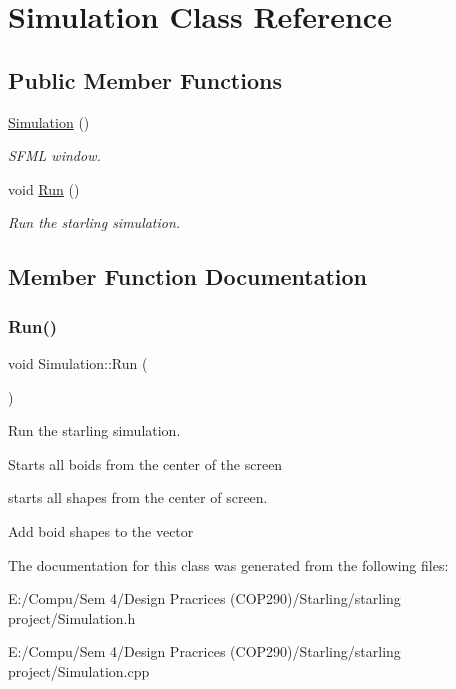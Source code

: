 \hypertarget{class_simulation}{}\section{Simulation Class Reference}
\label{class_simulation}
\subsection*{Public Member Functions}
\begin{DoxyCompactItemize}
\item 
\mbox{\label{class_simulation_a5b224cc5b36bcc8eb29689aff223de41}} 
\mbox{\hyperlink{class_simulation_a5b224cc5b36bcc8eb29689aff223de41}{Simulation}} ()
\begin{DoxyCompactList}\small\item\em S\+F\+ML window. \end{DoxyCompactList}\item 
void \mbox{\hyperlink{class_simulation_af0ad94212fd0a5af2f3f0b3a9be1b3a7}{Run}} ()
\begin{DoxyCompactList}\small\item\em Run the starling simulation. \end{DoxyCompactList}\end{DoxyCompactItemize}


\subsection{Member Function Documentation}
\mbox{\label{class_simulation_af0ad94212fd0a5af2f3f0b3a9be1b3a7}} 
\subsubsection{\texorpdfstring{Run()}{Run()}}
{\footnotesize\ttfamily void Simulation\+::\+Run (\begin{DoxyParamCaption}{ }\end{DoxyParamCaption})}



Run the starling simulation. 

Starts all boids from the center of the screen

starts all shapes from the center of screen.

Add boid shapes to the vector 

The documentation for this class was generated from the following files\+:\begin{DoxyCompactItemize}
\item 
E\+:/\+Compu/\+Sem 4/\+Design Pracrices (\+C\+O\+P290)/\+Starling/starling project/Simulation.\+h\item 
E\+:/\+Compu/\+Sem 4/\+Design Pracrices (\+C\+O\+P290)/\+Starling/starling project/Simulation.\+cpp\end{DoxyCompactItemize}
